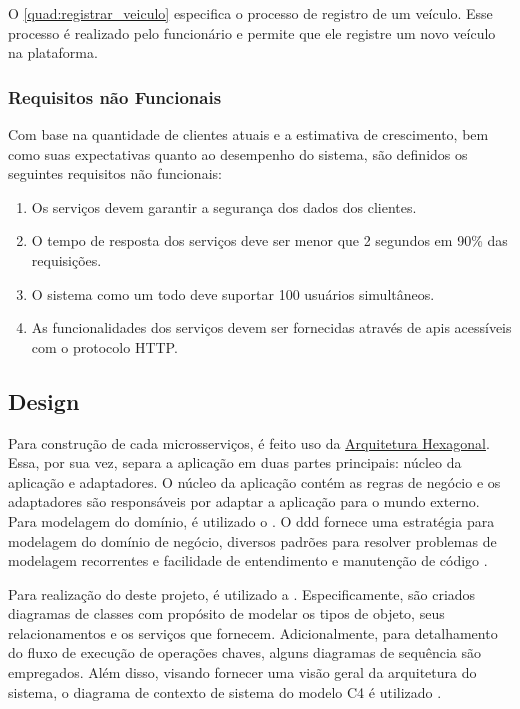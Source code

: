O \autoref{quad:registrar_veiculo} especifica o processo de registro de um veículo. Esse processo é realizado pelo funcionário e permite que ele registre um novo veículo na plataforma.

\subsubsection{Requisitos não Funcionais}
Com base na quantidade de clientes atuais e a estimativa de crescimento, bem como suas expectativas quanto ao desempenho do sistema, são definidos os seguintes requisitos não funcionais:
\begin{enumerate}
    \item Os serviços devem garantir a segurança dos dados dos clientes.
    \item O tempo de resposta dos serviços deve ser menor que 2 segundos em 90\% das requisições.
    \item O sistema como um todo deve suportar 100 usuários simultâneos.
    \item As funcionalidades dos serviços devem ser fornecidas através de \acrshort{api}s acessíveis com o protocolo HTTP.
\end{enumerate}

\subsection{Design}
Para construção de cada microsserviços, é feito uso da \hyperref[section:hexagonal]{Arquitetura Hexagonal}. Essa, por sua vez, separa a aplicação em duas partes principais: núcleo da aplicação e adaptadores. O núcleo da aplicação contém as regras de negócio e os adaptadores são responsáveis por adaptar a aplicação para o mundo externo. Para modelagem do domínio, é utilizado o . O \acrshort{ddd} fornece uma estratégia para modelagem do domínio de negócio, diversos padrões para resolver problemas de modelagem recorrentes e facilidade de entendimento e manutenção de código \cite{evans2004ddd}.

Para realização do  deste projeto, é utilizado a . Especificamente, são criados diagramas de classes com propósito de modelar os tipos de objeto, seus relacionamentos e os serviços que fornecem. Adicionalmente, para detalhamento do fluxo de execução de operações chaves, alguns diagramas de sequência são empregados. Além disso, visando fornecer uma visão geral da arquitetura do sistema, o diagrama de contexto de sistema do modelo C4 é utilizado \cite{c4Model}. 

